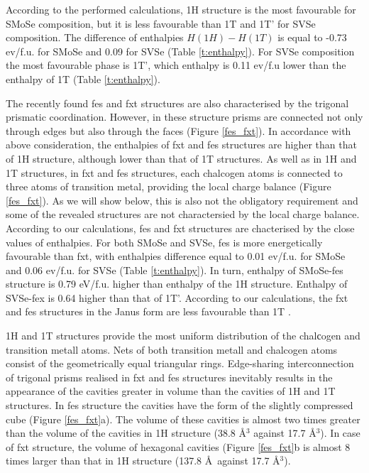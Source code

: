 \documentclass[a4paperm]{article}
\begin{document}
According to the performed calculations, 1H structure is the most favourable for SMoSe composition, but it is less favourable than 1T and 1T' for SVSe composition.
The difference of enthalpies $H(1H)-H(1T)$ is equal to -0.73 ev/f.u. for SMoSe and 0.09 for SVSe (Table \ref{t:enthalpy}).
For SVSe composition the most favourable phase is 1T', which enthalpy is 0.11 ev/f.u lower than the enthalpy of 1T (Table \ref{t:enthalpy}). 

The recently found fes and fxt structures are also characterised by the trigonal prismatic coordination.
However, in these structure prisms are connected not only through edges but also through the faces (Figure \ref{fes_fxt}).
In accordance with above consideration, the enthalpies of fxt and fes structures are higher than that of 1H structure, although lower than that of 1T structures.
As well as in 1H and 1T structures, in fxt and fes structures,  each chalcogen atoms is connected to three atoms of transition metal, providing the local charge balance (Figure \ref{fes_fxt}).
As we will show below, this is also not the obligatory requirement and some of the revealed structures are not charactersied by the local charge balance.
According to our calculations, fes and fxt structures are chacterised by the close values of enthalpies.
For both SMoSe and SVSe, fes is more energetically favourable than fxt, with enthalpies difference equal to 0.01 ev/f.u. for SMoSe and 0.06 ev/f.u. for SVSe (Table \ref{t:enthalpy}).
In turn, enthalpy of SMoSe-fes structure is 0.79 eV/f.u. higher than enthalpy of the 1H structure.
Enthalpy of SVSe-fex is 0.64 higher than that of 1T'.
According to our calculations, the fxt and fes structures in the Janus form are less favourable than 1T .

1H and 1T structures provide the most uniform distribution of the chalсogen and transition metall atoms.
Nets of  both transition metall and chalcogen atoms consist of the geometrically equal triangular rings.
Edge-sharing interconnection of trigonal prisms realised in fxt and fes structures inevitably results in the appearance of the cavities greater in volume than the cavities of 1H and 1T structures. 
In fes structure the cavities have the form of the slightly compressed cube (Figure \ref{fes_fxt}a).
The volume of these cavities is almost two times greater than the volume of the cavities in 1H structure (38.8 \AA$^3$ against 17.7 \AA$^3$).
In case of fxt structure, the volume of hexagonal cavities (Figure \ref{fes_fxt}b is almost 8 times larger than that in 1H structure (137.8 \AA\ against 17.7 \AA$^3$).
\end{document}
